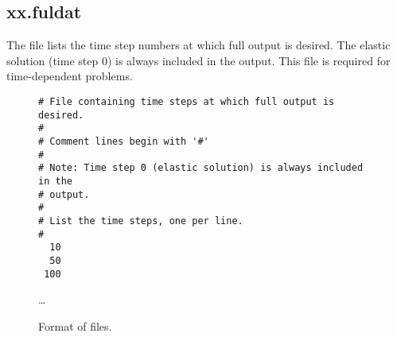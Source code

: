 \subsection{xx.fuldat}

The  file lists the time step numbers at which
full output is desired. The elastic solution (time step 0) is always
included in the output. This file is required for time-dependent
problems.

\begin{figure}
  \begin{center}
\begin{verbatim}
# File containing time steps at which full output is desired.
#
# Comment lines begin with '#'
#
# Note: Time step 0 (elastic solution) is always included in the
# output.
#
# List the time steps, one per line.
#
  10
  50
 100
\end{verbatim}
\ldots
    \caption{Format of  files.}
  \end{center}
\end{figure}

